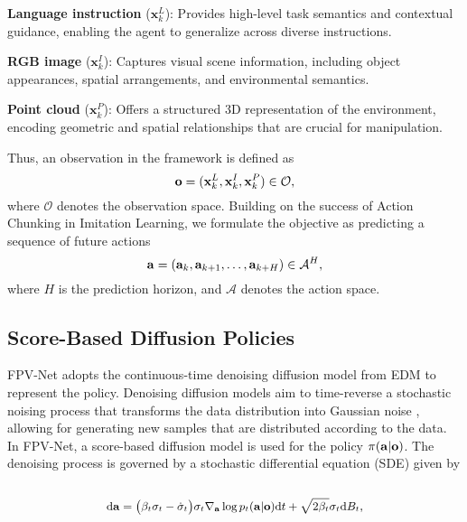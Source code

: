 \textbf{Language instruction} (\(\mathbf{x}_k^L\)): Provides high-level task semantics and contextual guidance, enabling the agent to generalize across diverse instructions.

\textbf{RGB image} (\(\mathbf{x}_k^I\)): Captures visual scene information, including object appearances, spatial arrangements, and environmental semantics.

\textbf{Point cloud} (\(\mathbf{x}_k^P\)): Offers a structured 3D representation of the environment, encoding geometric and spatial relationships that are crucial for manipulation.

Thus, an observation in the framework is defined as 
\begin{equation}
    \mathbf{o} = (\mathbf{x}_k^L, \mathbf{x}_k^I, \mathbf{x}_k^P) \in \mathcal{O},
\end{equation}
where $\mathcal{O}$ denotes the observation space.
%
Building on the success of Action Chunking \cite{zhao2023learning} in Imitation Learning, we formulate the objective as predicting a sequence of future actions
\begin{equation}
    \mathbf{a} = (\mathbf{a}_k, \mathbf{a}_{k+1}, \dots, \mathbf{a}_{k+H}) \in \mathcal{A}^H,
\end{equation}
where \(H\) is the prediction horizon, and $\mathcal{A}$ denotes the action space.


\subsection{Score-Based Diffusion Policies}

FPV-Net adopts the continuous-time denoising diffusion model from EDM \cite{karras2022elucidating} to represent the policy. Denoising diffusion models aim to time-reverse a stochastic noising process that transforms the data distribution into Gaussian noise \cite{song2020denoising}, allowing for generating new samples that are distributed according to the data. In FPV-Net, a score-based diffusion model is used for the policy \(\pi(\mathbf{a}|\mathbf{o})\). The denoising process is governed by a stochastic differential equation (SDE) given by
\
\begin{equation}
\small
\label{eq: conditional Karras Song SDE}
\begin{split}
\mathrm d \mathbf{a} =  \big( \beta_t \sigma_t - \dot{\sigma}_t  \big) \sigma_t \nabla_{\mathbf{a}} \log p_t(\mathbf{a} | \mathbf{o})  \mathrm dt + \sqrt{2 \beta_t} \sigma_t \mathrm d B_t,
 \end{split}
\end{equation}

